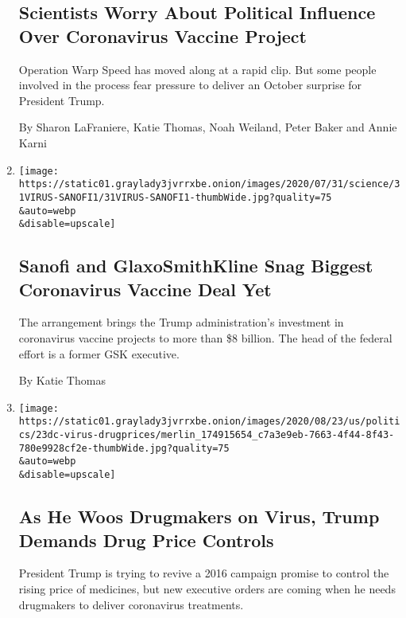 \begin{enumerate}
{  \subsection{Scientists Worry About Political Influence Over
  Coronavirus Vaccine
  Project}\label{scientists-worry-about-political-influence-over-coronavirus-vaccine-project}}

  Operation Warp Speed has moved along at a rapid clip. But some people
  involved in the process fear pressure to deliver an October surprise
  for President Trump.

  By Sharon LaFraniere, Katie Thomas, Noah Weiland, Peter Baker and
  Annie Karni
\item
  \href{/2020/07/31/health/covid-19-vaccine-sanofi-gsk.html}{}

  \texttt{[image: https://static01.graylady3jvrrxbe.onion/images/2020/07/31/science/31VIRUS-SANOFI1/31VIRUS-SANOFI1-thumbWide.jpg?quality=75\\\&auto=webp\\\&disable=upscale]}

  \hypertarget{sanofi-and-glaxosmithkline-snag-biggest-coronavirus-vaccine-deal-yet}{%
  \subsection{Sanofi and GlaxoSmithKline Snag Biggest Coronavirus
  Vaccine Deal
  Yet}\label{sanofi-and-glaxosmithkline-snag-biggest-coronavirus-vaccine-deal-yet}}

  The arrangement brings the Trump administration's investment in
  coronavirus vaccine projects to more than \$8 billion. The head of the
  federal effort is a former GSK executive.

  By Katie Thomas
\item
  \href{/2020/07/24/us/politics/trump-drug-prices-coronavirus.html}{}

  \texttt{[image: https://static01.graylady3jvrrxbe.onion/images/2020/08/23/us/politics/23dc-virus-drugprices/merlin\_174915654\_c7a3e9eb-7663-4f44-8f43-780e9928cf2e-thumbWide.jpg?quality=75\\\&auto=webp\\\&disable=upscale]}

  \hypertarget{as-he-woos-drugmakers-on-virus-trump-demands-drug-price-controls}{%
  \subsection{As He Woos Drugmakers on Virus, Trump Demands Drug Price
  Controls}\label{as-he-woos-drugmakers-on-virus-trump-demands-drug-price-controls}}

  President Trump is trying to revive a 2016 campaign promise to control
  the rising price of medicines, but new executive orders are coming
  when he needs drugmakers to deliver coronavirus treatments.


\end{enumerate}
